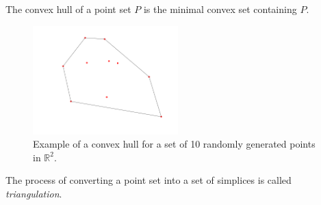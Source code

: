 \begin{definition}
The convex hull of a point set $P$ is the minimal convex set containing $P$.
\end{definition}
\begin{figure}[ht]
    \centering
    \includegraphics[width=0.5\textwidth]{report/Images/Theory/convex_hull.png}
    \caption[Example of a convex hull]{Example of a convex hull for a set of 10 randomly generated points in $\mathbb{R}^2$.}
    \label{fig:ex:convex_hull}
\end{figure}

The process of converting a point set into a set of simplices is called \emph{triangulation}.

